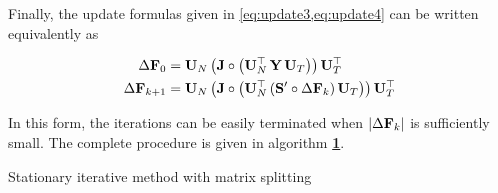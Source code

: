 Finally, the update formulas given in \cref{eq:update3,eq:update4} can be written equivalently as 

\begin{align}
    \Delta \mathbf{F}_0     & = \mathbf{U}_N \, \big( \mathbf{J}  \circ \big( \mathbf{U}_N^\top \, \mathbf{Y} \, \mathbf{U}_T \big) \big) \, \mathbf{U}_T^\top  \\
    \Delta \mathbf{F}_{k+1} & = \mathbf{U}_N \, \big( \mathbf{J}  \circ \big( \mathbf{U}_N^\top \, (\mathbf{S}' \circ \Delta \mathbf{F}_{k})\, \mathbf{U}_T \big) \big) \, \mathbf{U}_T^\top
\end{align}

In this form, the iterations can be easily terminated when $|\Delta \mathbf{F}_{k}|$ is sufficiently small. The complete procedure is given in algorithm \hyperlink{al:SIM}{\textbf{1}}.

\begin{algorithm}[t]
    \hypertarget{al:SIM}{}
    \caption{Stationary iterative method with matrix splitting}
    \begin{algorithmic}
        \vspace{0.05cm}
        \vspace{0.05cm}
        \vspace{0.05cm}
        \vspace{0.05cm}
        \vspace{0.05cm}
        \vspace{0.05cm}
        \vspace{0.15cm}
        \vspace{0.15cm}
        \vspace{0.15cm}
        \vspace{0.15cm}
        \vspace{0.15cm}

\end{algorithmic}
\end{algorithm}
